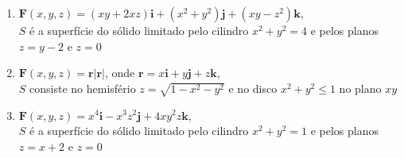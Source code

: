 \documentclass[a4paper, 12pt]{article}
\begin{document}
\begin{enumerate}
		\item $\textbf{F}(x,y,z) = (xy + 2xz)\textbf{i} + (x^2 + y^2)\textbf{j} + (xy - z^2)\textbf{k}$, \\ $S$ é a superfície do sólido limitado pelo cilindro $x^2 + y^2 = 4$ e pelos planos $z = y - 2$ e $z = 0$
		\resposta{\fazer}

		\item $\textbf{F}(x,y,z) = \textbf{r} |\textbf{r}|$, onde $\textbf{r} = x\textbf{i} + y\textbf{j} + z\textbf{k}$, \\ $S$ consiste no hemisfério $z = \sqrt{1 - x^2 - y^2}$ e no disco $x^2 + y^2 \leq 1$ no plano $xy$
		\resposta{$2\pi$}

		\item $\textbf{F}(x,y,z) = x^{4}\textbf{i} - x^{3}z^{2}\textbf{j} + 4xy^{2}z\textbf{k}$, \\ $S$ é a superfície do sólido limitado pelo cilindro $x^2 + y^2 = 1$ e pelos planos $z = x + 2$ e $z = 0$
		\resposta{\fazer}
	
	\end{enumerate}
		
	\vspace{5mm}	
	
\end{document}
